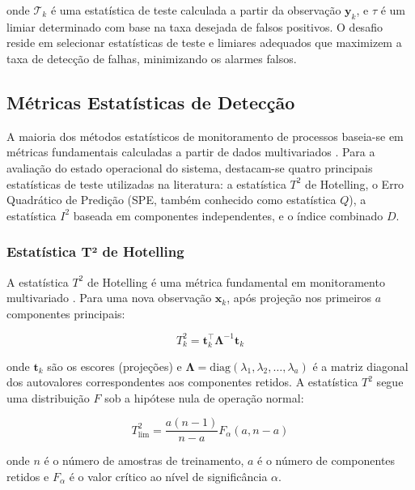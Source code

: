 \documentclass[journal]{IEEEtran}
\begin{document}
onde $\mathcal{T}_k$ é uma estatística de teste calculada a partir da observação $\mathbf{y}_k$, e $\tau$ é um limiar determinado com base na taxa desejada de falsos positivos. O desafio reside em selecionar estatísticas de teste e limiares adequados que maximizem a taxa de detecção de falhas, minimizando os alarmes falsos.

\subsection{Métricas Estatísticas de Detecção}
\label{subsec:statistical_metrics}

A maioria dos métodos estatísticos de monitoramento de processos baseia-se em métricas fundamentais calculadas a partir de dados multivariados \cite{venkatasubramanian2003}. Para a avaliação do estado operacional do sistema, destacam-se quatro principais estatísticas de teste utilizadas na literatura: a estatística $T^2$ de Hotelling, o Erro Quadrático de Predição (SPE, também conhecido como estatística $Q$), a estatística $I^2$ baseada em componentes independentes, e o índice combinado $D$.

\subsubsection{Estatística T² de Hotelling}

A estatística $T^2$ de Hotelling é uma métrica fundamental em monitoramento multivariado \cite{yin2012}. Para uma nova observação $\mathbf{x}_k$, após projeção nos primeiros $a$ componentes principais:

\begin{equation}
T^2_k = \mathbf{t}_k^\top \boldsymbol{\Lambda}^{-1} \mathbf{t}_k
\label{eq:t2_statistic}
\end{equation}

onde $\mathbf{t}_k$ são os escores (projeções) e $\boldsymbol{\Lambda} = \text{diag}(\lambda_1, \lambda_2, \ldots, \lambda_a)$ é a matriz diagonal dos autovalores correspondentes aos componentes retidos. A estatística $T^2$ segue uma distribuição $F$ sob a hipótese nula de operação normal:

\begin{equation}
T^2_{\text{lim}} = \frac{a(n-1)}{n-a} F_{\alpha}(a, n-a)
\label{eq:t2_limit}
\end{equation}

onde $n$ é o número de amostras de treinamento, $a$ é o número de componentes retidos e $F_{\alpha}$ é o valor crítico ao nível de significância $\alpha$.
\end{document}
